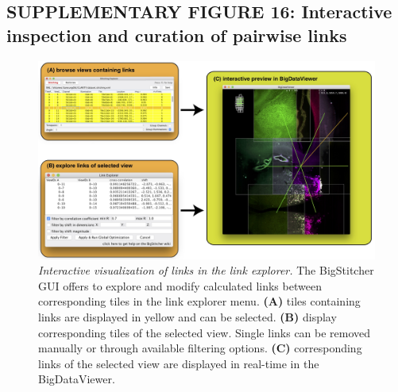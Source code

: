 \documentclass[]{spie}  %
\begin{document}
\subsection*{SUPPLEMENTARY FIGURE 16: Interactive inspection and curation of pairwise links}
\vspace{1mm}
\begin{figure}[h!]
\includegraphics[width=\textwidth]{Supp-Link-Explorer.jpg}
\vspace{-2.0mm}
\caption{\hspace{-0.5mm} \emph{Interactive visualization of links in the link explorer.} The BigStitcher GUI offers to explore and modify calculated links between corresponding tiles in the link explorer menu. \textbf{(A)} tiles containing links are displayed in yellow and can be selected. \textbf{(B)} display corresponding tiles of the selected view. Single links can be removed manually or through available filtering options. \textbf{(C)} corresponding links of the selected view are displayed in real-time in the BigDataViewer.
}
\label{fig:sup-fig-link-explorer}
\end{figure}

\pagebreak
\end{document}
